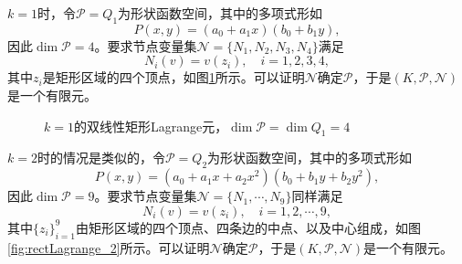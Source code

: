 \documentclass[a4paper,10pt]{ctexart}
\begin{document}
$ k=1 $时，令$ \mathcal{P} = Q_1 $为形状函数空间，其中的多项式形如
\[
    P(x,y) = (a_0 + a_1 x)(b_0 + b_1 y),
\]
因此$ \dim \mathcal{P} = 4 $。要求节点变量集$ \mathcal{N} = \{N_1,N_2,N_3,N_4\} $满足
\[
    N_i(v) = v(z_i),\quad i = 1,2,3,4,
\]
其中$ z_i $是矩形区域的四个顶点，如图\ref{fig:rectLagrange_1}所示。可以证明$ \mathcal{N} $确定$ \mathcal{P} $，于是$ (K,\mathcal{P},\mathcal{N}) $是一个有限元。

\begin{figure}[htpb]
    \centering
    \caption{$ k=1 $的双线性矩形Lagrange元，$ \dim \mathcal{P} = \dim Q_1= 4 $}
    \label{fig:rectLagrange_1}
\end{figure}

$ k=2 $时的情况是类似的，令$ \mathcal{P} = Q_2 $为形状函数空间，其中的多项式形如
\[
    P(x,y) = (a_0 + a_1 x + a_2 x^2)(b_0 + b_1 y + b_2 y^2),
\]
因此$ \dim \mathcal{P} = 9 $。要求节点变量集$ \mathcal{N} = \{N_1,\cdots ,N_9\} $同样满足
\[
    N_i(v) = v(z_i),\quad i = 1,2,\cdots ,9,  
\]
其中$ \{z_i\}_{i=1}^9 $由矩形区域的四个顶点、四条边的中点、以及中心组成，如图\ref{fig:rectLagrange_2}所示。可以证明$ \mathcal{N} $确定$ \mathcal{P} $，于是$ (K,\mathcal{P},\mathcal{N}) $是一个有限元。
\end{document}
